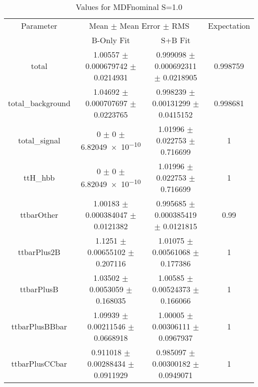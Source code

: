 \begin{table}
\centering
\caption{Values for MDFnominal S=1.0}
\begin{tabular}{cccc}
\toprule
Parameter & \multicolumn{2}{c}{Mean $\pm$ Mean Error $\pm$ RMS} & Expectation\\
 & B-Only Fit & S+B Fit & \\
\midrule
total & \num{1.00557} $\pm$ \num{0.000679742} $\pm$ \num{0.0214931} & \num{0.999098} $\pm$ \num{0.000692311} $\pm$ \num{0.0218905} & \num{0.998759}\\
total\_background & \num{1.04692} $\pm$ \num{0.000707697} $\pm$ \num{0.0223765} & \num{0.998239} $\pm$ \num{0.00131299} $\pm$ \num{0.0415152} & \num{0.998681}\\
total\_signal & \num{0} $\pm$ \num{0} $\pm$ \num{6.82049e-10} & \num{1.01996} $\pm$ \num{0.022753} $\pm$ \num{0.716699} & \num{1}\\
ttH\_hbb & \num{0} $\pm$ \num{0} $\pm$ \num{6.82049e-10} & \num{1.01996} $\pm$ \num{0.022753} $\pm$ \num{0.716699} & \num{1}\\
ttbarOther & \num{1.00183} $\pm$ \num{0.000384047} $\pm$ \num{0.0121382} & \num{0.995685} $\pm$ \num{0.000385419} $\pm$ \num{0.0121815} & \num{0.99}\\
ttbarPlus2B & \num{1.1251} $\pm$ \num{0.00655102} $\pm$ \num{0.207116} & \num{1.01075} $\pm$ \num{0.00561068} $\pm$ \num{0.177386} & \num{1}\\
ttbarPlusB & \num{1.03502} $\pm$ \num{0.0053059} $\pm$ \num{0.168035} & \num{1.00585} $\pm$ \num{0.00524373} $\pm$ \num{0.166066} & \num{1}\\
ttbarPlusBBbar & \num{1.09939} $\pm$ \num{0.00211546} $\pm$ \num{0.0668918} & \num{1.00005} $\pm$ \num{0.00306111} $\pm$ \num{0.0967937} & \num{1}\\
ttbarPlusCCbar & \num{0.911018} $\pm$ \num{0.00288434} $\pm$ \num{0.0911929} & \num{0.985097} $\pm$ \num{0.00300182} $\pm$ \num{0.0949071} & \num{1}\\
\bottomrule
\end{tabular}
\end{table}